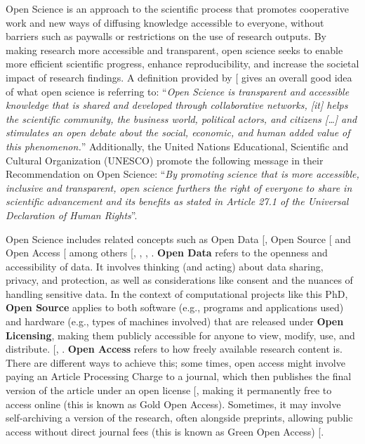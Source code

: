 \documentclass[
  11pt,
  letterpaper,
]{scrreprt}
\begin{document}
Open Science is an approach to the scientific process that promotes
cooperative work and new ways of diffusing knowledge accessible to
everyone, without barriers such as paywalls or restrictions on the use
of research outputs. By making research more accessible and transparent,
open science seeks to enable more efficient scientific progress, enhance
reproducibility, and increase the societal impact of research findings.
A definition provided by {[}\citeproc{ref-vicente-saez2018Open}{358}{]}
gives an overall good idea of what open science is referring to:
``\emph{Open Science is transparent and accessible knowledge that is
shared and developed through collaborative networks, {[}it{]} helps the
scientific community, the business world, political actors, and citizens
{[}\ldots{]} and stimulates an open debate about the social, economic,
and human added value of this phenomenon.}'' Additionally, the United
Nations Educational, Scientific and Cultural Organization (UNESCO)
promote the following message in their Recommendation on Open Science:
``\emph{By promoting science that is more accessible, inclusive and
transparent, open science furthers the right of everyone to share in
scientific advancement and its benefits as stated in Article 27.1 of the
Universal Declaration of Human Rights}''.

Open Science includes related concepts such as Open Data
{[}\citeproc{ref-Whata}{359}{]}, Open Source
{[}\citeproc{ref-Open}{360}{]} and Open Access
{[}\citeproc{ref-suber2012Open}{361}{]} among others
{[},
, ,
\citeproc{ref-parsons2022Communitysourced}{363}{]}. \textbf{Open Data}
refers to the openness and accessibility of data. It involves thinking
(and acting) about data sharing, privacy, and protection, as well as
considerations like consent and the nuances of handling sensitive data.
In the context of computational projects like this PhD, \textbf{Open
Source} applies to both software (e.g., programs and applications used)
and hardware (e.g., types of machines involved) that are released under
\textbf{Open Licensing}, making them publicly accessible for anyone to
view, modify, use, and distribute. {[},
\citeproc{ref-kreutzer2014Open}{365}{]}. \textbf{Open Access} refers to
how freely available research content is. There are different ways to
achieve this; some times, open access might involve paying an Article
Processing Charge to a journal, which then publishes the final version
of the article under an open license
{[}\citeproc{ref-borrego2023Article}{366}{]}, making it permanently free
to access online (this is known as Gold Open Access). Sometimes, it may
involve self-archiving a version of the research, often alongside
preprints, allowing public access without direct journal fees (this is
known as Green Open Access) {[}\citeproc{ref-bjork2014Anatomy}{367}{]}.
\end{document}
